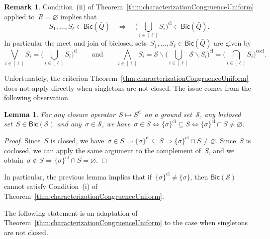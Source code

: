 \documentclass{amsart}
\newtheorem{lemma}[theorem]{Lemma}
\theoremstyle{definition}
\newtheorem{remark}[theorem]{Remark}
\newcommand{\cS}{\mathcal{S}} %
\newcommand{\ssm}{\smallsetminus} %
\newcommand{\bigMeet}{\bigwedge} %
\newcommand{\bigJoin}{\bigvee} %
\newcommand{\closure}[1]{#1^{\mathrm{cl}}} %
\newcommand{\coclosure}[1]{#1^{\mathrm{cocl}}} %
\newcommand{\Bicl}[1]{\mathsf{Bic}(#1)} %
\begin{document}
\begin{remark}
\label{rem:meetJoinBiclosedSets}
Condition~(ii) of Theorem~\ref{thm:characterizationCongruenceUniform} applied to~$R = \varnothing$ implies that
\[
S_1, \dots, S_\ell \in \Bicl{\bar Q} \quad \Longrightarrow \quad \closure{\Big( \bigcup_{i \in [\ell]} S_i \Big)} \in \Bicl{\bar Q}.
\]
In particular the meet and join of biclosed sets~$S_1, \dots, S_\ell \in \Bicl{\bar Q}$ are given by
\[
\bigJoin_{i \in [\ell]} S_i = \closure{\Big( \bigcup_{i \in [\ell]} S_i \Big)}
\qquad\text{and}\qquad
\bigMeet_{i \in [\ell]} S_i = \cS \ssm \closure{\Big( \bigcup_{i \in [\ell]} \cS \ssm S_i \Big)} = \coclosure{\Big( \bigcap_{i \in [\ell]} S_i \Big)}.
\]
\end{remark}

\medskip
Unfortunately, the criterion Theorem~\ref{thm:characterizationCongruenceUniform} does not apply directly when singletons are not closed.
The issue comes from the following observation.

\begin{lemma}
\label{lem:loops}
For any closure operator~$S \mapsto \closure{S}$ on a ground set~$\cS$, any biclosed set~$S \in \Bicl{\cS}$ and any~$\sigma \in \cS$, we have~$\sigma \in S \iff \closure{\{\sigma\}} \subseteq S \iff \closure{\{\sigma\}} \cap S \ne \varnothing$.
\end{lemma}

\begin{proof}
Since~$S$ is closed, we have~$\sigma \in S \Longrightarrow \closure{\{\sigma\}} \subseteq S \Longrightarrow \closure{\{\sigma\}} \cap S \ne \varnothing$.
Since~$S$ is coclosed, we can apply the same argument to the complement of~$S$, and we obtain~$\sigma \notin S \Longrightarrow \closure{\{\sigma\}} \cap S = \varnothing$.
\end{proof}

In particular, the previous lemma implies that if~$\closure{\{\sigma\}} \ne \{\sigma\}$, then $\Bicl{\cS}$ cannot satisfy Condition~(i) of Theorem~\ref{thm:characterizationCongruenceUniform}.

The following statement is an adaptation of Theorem~\ref{thm:characterizationCongruenceUniform} to the case when singletons are not closed.
\end{document}
